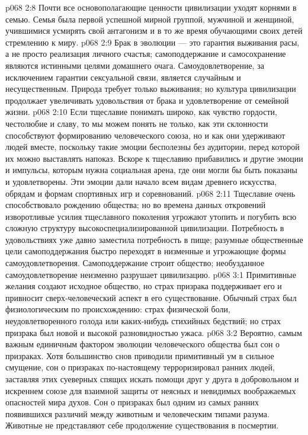 \vs p068 2:8 Почти все основополагающие ценности цивилизации уходят корнями в семью. Семья была первой успешной мирной группой, мужчиной и женщиной, учившимися усмирять свой антагонизм и в то же время обучающими своих детей стремлению к миру.
\vs p068 2:9 Брак в эволюции --- это гарантия выживания расы, а не просто реализация личного счастья; самоподдержание и самосохранение являются истинными целями домашнего очага. Самоудовлетворение, за исключением гарантии сексуальной связи, является случайным и несущественным. Природа требует только выживания; но культура цивилизации продолжает увеличивать удовольствия от брака и удовлетворение от семейной жизни.
\vs p068 2:10 \pc Если тщеславие понимать широко, как чувство гордости, честолюбие и славу, то мы можем понять не только, как эти склонности способствуют формированию человеческого союза, но и как они удерживают людей вместе, поскольку такие эмоции бесполезны без аудитории, перед которой их можно выставлять напоказ. Вскоре к тщеславию прибавились и другие эмоции и импульсы, которым нужна социальная арена, где они могли бы быть показаны и удовлетворены. Эти эмоции дали начало всем видам древнего искусства, обрядам и формам спортивных игр и соревнований.
\vs p068 2:11 Тщеславие очень способствовало рождению общества; но во времена данных откровений изворотливые усилия тщеславного поколения угрожают утопить и погубить всю сложную структуру высокоспециализированной цивилизации. Потребность в удовольствиях уже давно заместила потребность в пище; разумные общественные цели самоподдержания быстро переходят в низменные и угрожающие формы самоудовлетворения. Самоподдержание строит общество; необузданное самоудовлетворение неизменно разрушает цивилизацию.
\vs p068 3:1 Примитивные желания создают исходное общество, но страх призрака поддерживает его и привносит сверх\hyp{}человеческий аспект в его существование. Обычный страх был физиологическим по происхождению: страх физической боли, неудовлетворенного голода или каких\hyp{}нибудь стихийных бедствий; но страх призрака был новой и высокой разновидностью ужаса.
\vs p068 3:2 Вероятно, самым важным единичным фактором эволюции человеческого общества был сон о призраках. Хотя большинство снов приводили примитивный ум в сильное смущение, сон о призраках по\hyp{}настоящему терроризировал ранних людей, заставляя этих суеверных спящих искать помощи друг у друга в добровольном и искреннем союзе для взаимной защиты от неясных и невидимых воображаемых опасностей мира духов. Сон о призраках был одним из самых ранних появившихся различий между животным и человеческим типами разума. Животные не представляют себе продолжение существования в посмертии.
